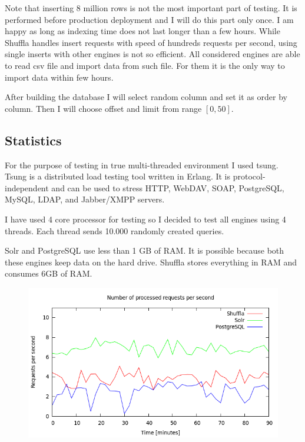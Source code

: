 \documentclass[10pt,a4paper]{article}
\begin{document}
Note that inserting 8 million rows is not the most important part of testing. It is performed before production deployment and I will do this part only once. I am happy as long as indexing time does not last longer than a few hours. While Shuffla handles insert requests with speed of hundreds requests per second, using single inserts with other engines is not so efficient. All considered engines are able to read csv file and import data from such file. For them it is the only way to import data within few hours.

After building the database I will select random column and set it as order by column. Then I will choose offset and limit from range $[0, 50]$.

\subsection{Statistics}

For the purpose of testing in true multi-threaded environment I used tsung. Tsung is a distributed load testing tool written in Erlang. It is protocol-independent and can be used to stress HTTP, WebDAV, SOAP, PostgreSQL, MySQL, LDAP, and Jabber/XMPP servers. 

I have used 4 core processor for testing so I decided to test all engines using 4 threads. Each thread sends 10.000 randomly created queries. 

Solr and PostgreSQL use less than 1 GB of RAM. It is possible because both these engines keep data on the hard drive. Shuffla stores everything in RAM and consumes 6GB of RAM. 

\begin{figure}[!ht]
\centering
  \includegraphics[width=12cm]{request_count_tn}
  \label{fig:request_count_tn}
\end{figure}
\end{document}

